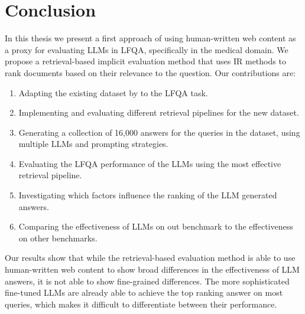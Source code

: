 \section{Conclusion}
In this thesis we present a first approach of using human-written web content as a proxy for evaluating LLMs in LFQA, specifically in the medical domain.
We propose a retrieval-based implicit evaluation method that uses IR methods to rank documents based on their relevance to the question.
Our contributions are:
\begin{enumerate}
    \item Adapting the existing dataset by \cite{goeuriot:2021:Consumer} to the LFQA task.
    \item Implementing and evaluating different retrieval pipelines for the new dataset.
    \item Generating a collection of 16,000 answers for the queries in the dataset, using multiple LLMs and prompting strategies.
    \item Evaluating the LFQA performance of the LLMs using the most effective retrieval pipeline.
    \item Investigating which factors influence the ranking of the LLM generated answers.
    \item Comparing the effectiveness of LLMs on out benchmark to the effectiveness on other benchmarks.
\end{enumerate}

Our results show that while the retrieval-based evaluation method is able to use human-written web content to show broad differences in the effectiveness of LLM answers, it is not able to show fine-grained differences.
The more sophisticated fine-tuned LLMs are already able to achieve the top ranking answer on most queries, which makes it difficult to differentiate between their performance.
